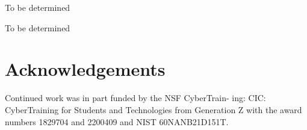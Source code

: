 \documentclass[11pt,twocolumn]{article}
\begin{document}
\begin{table}[htb]

\caption{To be determined}
\label{tab:tbd}
\bigskip
\centering%
\end{table}

\begin{table}[htb]

\caption{To be determined}
\label{tab:tbdetermined}
\bigskip
\centering%
\end{table}

\section*{Acknowledgements}

Continued work was in part funded by the NSF CyberTrain-
ing: CIC: CyberTraining for Students and Technologies from
Generation Z with the award numbers 1829704 and 2200409
and NIST 60NANB21D151T.




\end{document}
